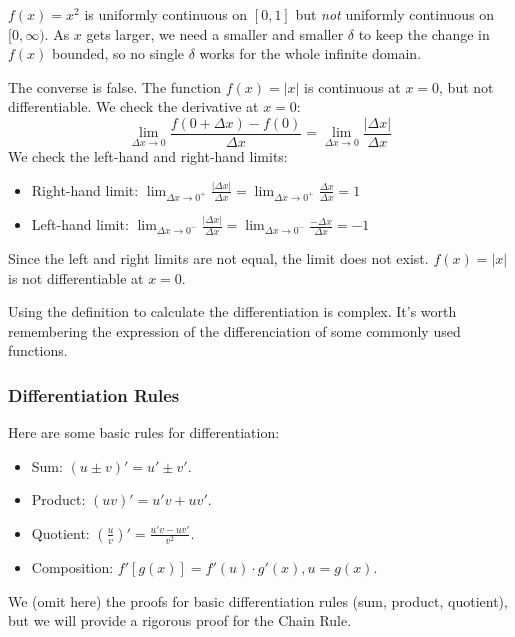 \begin{example}
$f(x) = x^2$ is uniformly continuous on $[0, 1]$ but \emph{not} uniformly continuous on $[0, \infty)$. As $x$ gets larger, we need a smaller and smaller $\delta$ to keep the change in $f(x)$ bounded, so no single $\delta$ works for the whole infinite domain.
\end{example}

\newpage

\begin{example}
The converse is false. The function $f(x) = |x|$ is continuous at $x=0$, but not differentiable.
We check the derivative at $x=0$:
\[
\lim_{\Delta x \to 0} \frac{f(0 + \Delta x) - f(0)}{\Delta x} = \lim_{\Delta x \to 0} \frac{|\Delta x|}{\Delta x}
\]
We check the left-hand and right-hand limits:
\begin{itemize}
    \item Right-hand limit: $\lim_{\Delta x \to 0^+} \frac{|\Delta x|}{\Delta x} = \lim_{\Delta x \to 0^+} \frac{\Delta x}{\Delta x} = 1$
    \item Left-hand limit: $\lim_{\Delta x \to 0^-} \frac{|\Delta x|}{\Delta x} = \lim_{\Delta x \to 0^-} \frac{-\Delta x}{\Delta x} = -1$
\end{itemize}
Since the left and right limits are not equal, the limit does not exist. $f(x) = |x|$ is not differentiable at $x=0$.
\end{example}

Using the definition to calculate the differentiation is complex. It's worth remembering the expression of the differenciation of some commonly used functions.

\subsubsection{Differentiation Rules}

Here are some basic rules for differentiation:
\begin{itemize}
    \item Sum: $(u\pm v)'=u'\pm v'$.
    \item Product: $(uv)'=u'v+uv'$.
    \item Quotient: $(\frac{u}{v})'=\frac{u'v-uv'}{v^2}$.
    \item Composition: $f'[g(x)]=f'(u) \cdot g'(x), u = g(x)$.
\end{itemize}

We (omit here) the proofs for basic differentiation rules (sum, product, quotient), but we will provide a rigorous proof for the Chain Rule.

